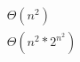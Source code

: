 \documentclass[14pt]{extarticle} %
\begin{document}
\begin{gather}
\Theta(n^2) \\
\Theta(n^2 * 2^{n^2})
\end{gather}
\end{document}
